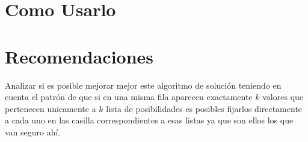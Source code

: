 \documentclass[a4paper,10pt,twocolumn]{article}
\begin{document}
   



\section{Como Usarlo}

\section{Recomendaciones}\label{sec:rec}

Analizar si es posible mejorar mejor este algoritmo de solución teniendo en cuenta el patrón de que si en una misma fila aparecen exactamente $k $ valores que pertenecen unicamente a $k$ lista de posibilidades es posibles fijarlos directamente a cada uno en las casilla correspondientes a esas listas ya que son ellos los que van seguro ahí.   







\label{end}
\end{document}
